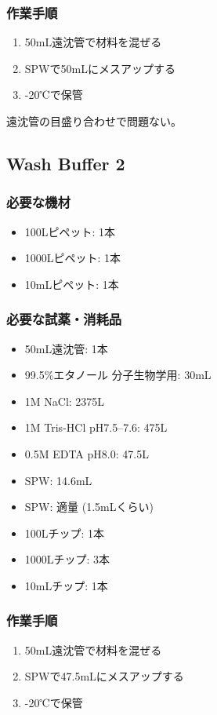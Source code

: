 \documentclass[titlepage,10pt,a4paper]{jsbook}
\begin{document}
\subsubsection{作業手順}
\begin{enumerate}
\item 50mL遠沈管で材料を混ぜる
\item SPWで50mLにメスアップする
\item -20℃で保管
\end{enumerate}

遠沈管の目盛り合わせで問題ない。

\subsection{Wash Buffer 2}

\subsubsection{必要な機材}
\begin{itemize}
\item 100{\textmu}Lピペット: 1本
\item 1000{\textmu}Lピペット: 1本
\item 10mLピペット: 1本
\end{itemize}

\subsubsection{必要な試薬・消耗品}
\begin{itemize}
\item 50mL遠沈管: 1本
\item 99.5\%エタノール 分子生物学用: 30mL
\item 1M NaCl: 2375{\textmu}L
\item 1M Tris-HCl pH7.5--7.6: 475{\textmu}L
\item 0.5M EDTA pH8.0: 47.5{\textmu}L
\item SPW: 14.6mL
\item SPW: 適量 (1.5mLくらい)
\item 100{\textmu}Lチップ: 1本
\item 1000{\textmu}Lチップ: 3本
\item 10mLチップ: 1本
\end{itemize}

\subsubsection{作業手順}
\begin{enumerate}
\item 50mL遠沈管で材料を混ぜる
\item SPWで47.5mLにメスアップする
\item -20℃で保管
\end{enumerate}
\end{document}
